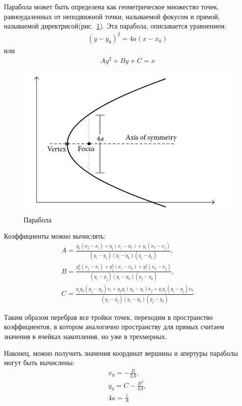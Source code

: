 \documentclass[12pt]{article} %
\begin{document}
Парабола может быть определена как геометрическое множество точек, равноудаленных от неподвижной точки, называемой фокусом и прямой, называемой директрисой(рис.~\ref{fig:hough_parab}). Эта парабола, описывается уравнением:
\begin{gather}\label{parab_equ}
	(y-y_0)^2 = 4a(x-x_0)
\end{gather}
 или
 \begin{gather}\label{parab_equ_2}
 	Ay^2+By+C=x
 \end{gather}
\begin{figure}[h]
	
	\centering
	
	\includegraphics[width=0.6\linewidth]{hough_parab.jpg}
	
	\caption{Парабола}
	
	\label{fig:hough_parab}
	
\end{figure}

Коэффициенты можно вычислять\cite{Hough_Parab}: 
 \begin{gather}\label{parab_equ_3}
	A=\frac{y_k(x_j-x_i)+y_j(x_i-x_k)+y_i(x_k-x_j)}{(y_i-y_j)(y_i-y_k)(y_j-y_k)},\\
	B=\frac{y_k^2(x_j-x_i)+y_j^2(x_i-x_k)+y_i^2(x_k-x_j)}{(y_i-y_j)(y_i-y_k)(y_j-y_k)},\\
	C= \frac{y_jy_k(y_j-y_k)x_i+y_ky_i(y_k-y_i)x_j+y_iy_j(y_i-y_j)x_k}{(y_i-y_j)(y_i-y_k)(y_j-y_k)}
\end{gather}

Таким образом перебрав все тройки точек, переходим в пространство коэффициентов, в котором аналогично пространству для прямых считаем значения в ячейках накопления, но уже в трехмерных.

Наконец, можно получить значения координат вершины и апертуры параболы могут быть вычислены:
\begin{gather}\label{parab_equ_4}
	x_0 = -\frac{B}{2A},\\
	y_0 = C-\frac{B^2}{4A},\\
	4a=\frac{1}{A}
\end{gather}
\end{document}
